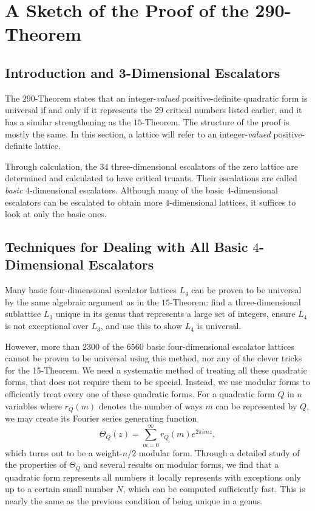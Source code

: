 \documentclass[letterpaper, 12pt]{article}
\begin{document}
\section{A Sketch of the Proof of the 290-Theorem}
\subsection{Introduction and 3-Dimensional Escalators}
The $290$-Theorem \cite{twoninety} states that an integer-\emph{valued} positive-definite quadratic form is universal if and only if it represents the $29$ critical numbers listed earlier,
and it has a similar strengthening as the $15$-Theorem.
The structure of the proof is mostly the same.
In this section, a lattice will refer to an integer-\emph{valued} positive-definite lattice.

Through calculation, the $34$ three-dimensional escalators of the zero lattice are determined and calculated to have critical truants.
Their escalations are called \emph{basic} $4$-dimensional escalators. Although many of the basic $4$-dimensional escalators can be escalated to obtain more $4$-dimensional lattices, it suffices to look at only the basic ones.

\subsection{Techniques for Dealing with All Basic $4$-Dimensional Escalators}
Many basic four-dimensional escalator lattices $L_4$ can be proven to be universal by the same algebraic argument as in the $15$-Theorem:
find a three-dimensional sublattice $L_3$ unique in its genus that represents a large set of integers, ensure $L_4$ is not exceptional over $L_3$, and use this to show $L_4$ is universal.

However, more than $2300$ of the $6560$ basic four-dimensional escalator lattices cannot be proven to be universal using this method, nor any of the clever tricks for the 15-Theorem. We need a systematic method of treating all these quadratic forms, that does not require them to be special.
Instead, we use modular forms to efficiently treat every one of these quadratic forms. For a quadratic form $Q$ in $n$ variables where $r_Q(m)$ denotes the number of ways $m$ can be represented by $Q$, we may create its Fourier series generating function
\[\Theta_Q(z) = \sum_{m = 0}^{\infty} r_Q(m) e^{2\pi i m z},\]
which turns out to be a weight-$n/2$ modular form. Through a detailed study of the properties of $\Theta_Q$ and several results on modular forms, we find that a quadratic form represents all numbers it locally represents with exceptions only up to a certain small number $N$, which can be computed sufficiently fast. This is nearly the same as the previous condition of being unique in a genus.
\end{document}
